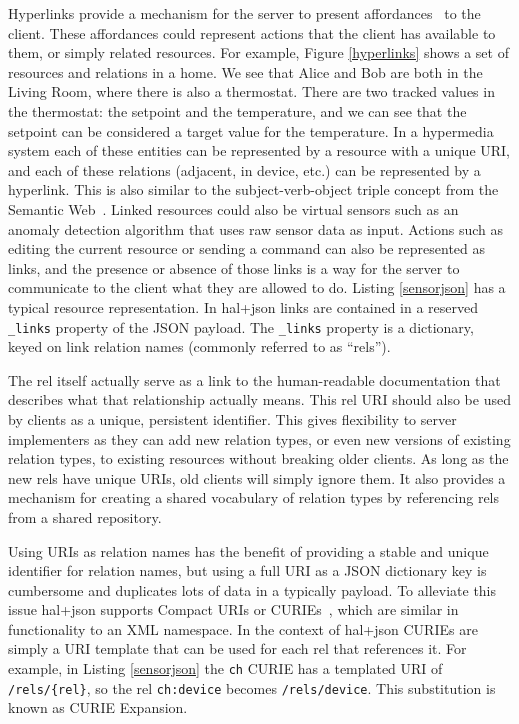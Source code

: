 \documentclass{acm_proc_article-sp}
\begin{document}
Hyperlinks provide a mechanism for the server to present
affordances~\cite{gibson} to the client. These affordances could represent
actions that the client has available to them, or simply related resources. For
example, Figure \ref{hyperlinks} shows a set of resources and relations in a
home. We see that Alice and Bob are both in the Living Room, where there is
also a thermostat. There are two tracked values in the thermostat: the setpoint
and the temperature, and we can see that the setpoint can be considered a
target value for the temperature. In a hypermedia system each of these entities
can be represented by a resource with a unique URI, and each of these
relations (adjacent, in device, etc.) can be represented by a hyperlink. This
is also similar to the subject-verb-object triple concept from the Semantic
Web~\cite{bernerslee2001semantic}. Linked resources could also be virtual
sensors such as an anomaly detection algorithm that uses raw sensor data as
input. Actions such as editing the current resource or sending a command can
also be represented as links, and the presence or absence of those links is a
way for the server to communicate to the client what they are allowed to do.
Listing \ref{sensorjson} has a typical resource representation.  In hal+json
links are contained in a reserved \texttt{\_links} property of the JSON
payload. The \texttt{\_links} property is a dictionary, keyed on link relation
names (commonly referred to as ``rels'').

The rel itself actually serve as a link to the human-readable documentation
that describes what that relationship actually means. This rel URI should also
be used by clients as a unique, persistent identifier. This gives flexibility
to server implementers as they can add new relation types, or even new versions
of existing relation types, to existing resources without breaking older
clients. As long as the new rels have unique URIs, old clients will simply
ignore them. It also provides a mechanism for creating a shared vocabulary of
relation types by referencing rels from a shared repository.

Using URIs as relation names has the benefit of providing a stable and unique
identifier for relation names, but using a full URI as a JSON dictionary key is
cumbersome and duplicates lots of data in a typically payload. To alleviate this
issue hal+json supports Compact URIs or CURIEs~\cite{curies}, which are similar in
functionality to an XML namespace. In the context of hal+json CURIEs are simply
a URI template that can be used for each rel that references it. For example,
in Listing \ref{sensorjson} the \texttt{ch} CURIE has a templated URI of
\texttt{/rels/\{rel\}}, so the rel \texttt{ch:device} becomes
\texttt{/rels/device}. This substitution is known as CURIE Expansion.
\end{document}
